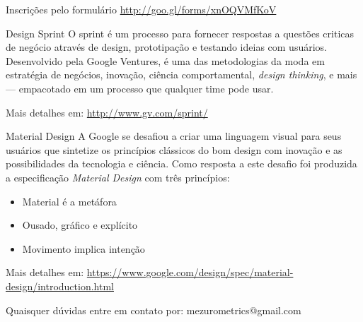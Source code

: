 \documentclass[final]{beamer} %
\begin{document}
\begin{frame}{}
\begin{block}{\large Inscrições pelo formulário}
      \url{http://goo.gl/forms/xnOQVMfKoV}
    \end{block}
    \vfill
    \begin{block}{\large Design Sprint}
      O sprint é um processo para fornecer respostas a questões criticas de negócio através de design, prototipação e testando ideias com usuários. Desenvolvido pela Google Ventures, é uma das metodologias da moda em estratégia de negócios, inovação, ciência comportamental, \textit{design thinking}, e mais — empacotado em um processo que qualquer time pode usar.

      Mais detalhes em: \url{http://www.gv.com/sprint/}
    \end{block}
    \vfill
    \begin{block}{\large Material Design}
      A Google se desafiou a criar uma linguagem visual para seus usuários que sintetize os princípios clássicos do bom design com inovação e as possibilidades da tecnologia e ciência. Como resposta a este desafio foi produzida a especificação \textit{Material Design} com três princípios:

      \begin{itemize}
        \item Material é a metáfora
        \item Ousado, gráfico e explícito
        \item Movimento implica intenção
      \end{itemize}

      Mais detalhes em: \url{https://www.google.com/design/spec/material-design/introduction.html}
    \end{block}
    \vfill
    {\large Quaisquer dúvidas entre em contato por: mezurometrics@gmail.com}
    \vfill
  \end{frame}
\end{document}
